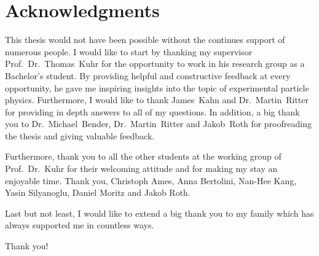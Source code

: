 \thispagestyle{empty}
\chapter*{Acknowledgments}

This thesis would not have been possible without the continues support of numerous people. I would like to start by thanking my supervisor Prof.~Dr.~Thomas~Kuhr for the opportunity to work in his research group as a Bachelor's student. By providing helpful and constructive feedback at every opportunity, he gave me inspiring insights into the topic of experimental particle physics. Furthermore, I would like to thank James~Kahn and Dr.~Martin~Ritter for providing in depth answers to all of my questions.
In addition, a big thank you to Dr.~Michael~Bender, Dr.~Martin~Ritter and Jakob~Roth for proofreading the thesis and giving valuable feedback.

Furthermore, thank you to all the other students at the working group of Prof.~Dr.~Kuhr for their welcoming attitude and for making my stay an enjoyable time. Thank you, Christoph Ames, Anna Bertolini, Nan-Hee Kang, Yasin Silyanoglu, Daniel Moritz and Jakob Roth.

Last but not least, I would like to extend a big thank you to my family which has always supported me in countless ways.

Thank you!

